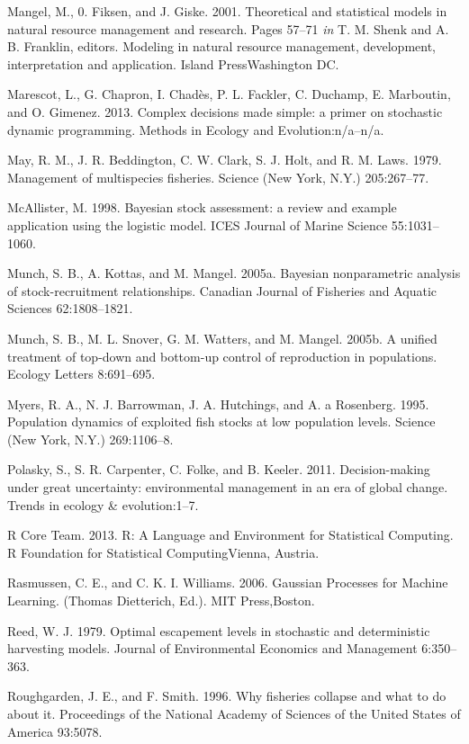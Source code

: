 \documentclass[author-year, 12pt,review]{components/elsarticle} %
\begin{document}
Mangel, M., 0. Fiksen, and J. Giske. 2001. Theoretical and statistical
models in natural resource management and research. Pages 57--71
\emph{in} T. M. Shenk and A. B. Franklin, editors. Modeling in natural
resource management, development, interpretation and application. Island
PressWashington DC.

Marescot, L., G. Chapron, I. Chadès, P. L. Fackler, C. Duchamp, E.
Marboutin, and O. Gimenez. 2013. Complex decisions made simple: a primer
on stochastic dynamic programming. Methods in Ecology and
Evolution:n/a--n/a.

May, R. M., J. R. Beddington, C. W. Clark, S. J. Holt, and R. M. Laws.
1979. Management of multispecies fisheries. Science (New York, N.Y.)
205:267--77.

McAllister, M. 1998. Bayesian stock assessment: a review and example
application using the logistic model. ICES Journal of Marine Science
55:1031--1060.

Munch, S. B., A. Kottas, and M. Mangel. 2005a. Bayesian nonparametric
analysis of stock-recruitment relationships. Canadian Journal of
Fisheries and Aquatic Sciences 62:1808--1821.

Munch, S. B., M. L. Snover, G. M. Watters, and M. Mangel. 2005b. A
unified treatment of top-down and bottom-up control of reproduction in
populations. Ecology Letters 8:691--695.

Myers, R. A., N. J. Barrowman, J. A. Hutchings, and A. a Rosenberg.
1995. Population dynamics of exploited fish stocks at low population
levels. Science (New York, N.Y.) 269:1106--8.

Polasky, S., S. R. Carpenter, C. Folke, and B. Keeler. 2011.
Decision-making under great uncertainty: environmental management in an
era of global change. Trends in ecology \& evolution:1--7.

R Core Team. 2013. R: A Language and Environment for Statistical
Computing. R Foundation for Statistical ComputingVienna, Austria.

Rasmussen, C. E., and C. K. I. Williams. 2006. Gaussian Processes for
Machine Learning. (Thomas Dietterich, Ed.). MIT Press,Boston.

Reed, W. J. 1979. Optimal escapement levels in stochastic and
deterministic harvesting models. Journal of Environmental Economics and
Management 6:350--363.

Roughgarden, J. E., and F. Smith. 1996. Why fisheries collapse and what
to do about it. Proceedings of the National Academy of Sciences of the
United States of America 93:5078.
\end{document}
